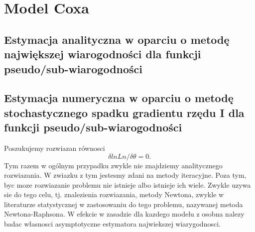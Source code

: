 \chapter{Model Coxa}
\section{Estymacja analityczna w oparciu o metodę największej wiarogodności dla funkcji pseudo/sub-wiarogodności}
\section{Estymacja numeryczna w oparciu o metodę stochastycznego spadku gradientu rzędu I dla funkcji pseudo/sub-wiarogodności}
Poszukujemy rozwiazan równosci
$$ \delta ln Ln  / \delta \theta =  0.$$
Tym razem w ogólnym przypadku zwykle nie znajdziemy analitycznego rozwiazania. W
zwiazku z tym jestesmy zdani na metody iteracyjne. Poza tym, byc moze rozwiazanie problemu
nie istnieje albo istnieje ich wiele. Zwykle uzywa sie do tego celu, tj. znalezienia
rozwiazania, metody Newtona, zwykle w literaturze statystycznej w zastosowaniu do tego
problemu, nazywanej metoda Newtona-Raphsona. W efekcie w zasadzie dla kazdego modelu
z osobna nalezy badac własnosci asymptotyczne estymatora najwiekszej wiarygodnosci.